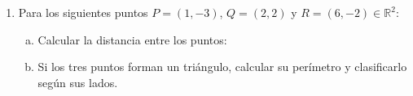 \documentclass[11pt,a4paper]{article}
\begin{document}
\begin{enumerate}[\hspace{-5mm} 1) ]
\begin{enumerate}[a)]
\begin{enumerate}[i)]
            \item Como $\vec{v}= \overrightarrow{BC}$ es igual a $(0, 2,-3)$ tenemos:
            $$\|\vec{v}\|= \|(0, 2,-3)\| = \sqrt{0^2 + 2^2+ (-3)^2}= \sqrt{ 13\,} \approx 3,605$$
            
            \item Por propiedad tenemos que $\|-v\|= \|v\|$ con lo cual:
            $$\|-\vec{v}\| = \sqrt{ 13\,} \approx 3,605 $$
            
            \item Tenemos que: 
            \begin{itemize}
                \item $\overrightarrow{m} = \overrightarrow{AC} = C-A = (1,0,-2) -(1,3,1) = (1-1,\, 0-3,\, -2-1) = (0,\, -3,\, -3)$,
            \end{itemize}
            luego tenemos:
            $$\|\sqrt{2} \cdot \overrightarrow{m}\| =   \|(0,\, -\sqrt{2}\cdot 3,\, -\sqrt{2}\cdot 3 )\| = \cdot \sqrt{0^2 +(-\sqrt{2}\cdot3)^2+(-\sqrt{2}\cdot3)^2\, } = \sqrt{ 18+18} = \sqrt{36} = 6$$  
        \end{enumerate}
\end{enumerate}


















\item  Para los siguientes puntos $P = (1, -3)$, $Q = (2, 2)$ y $R = (6, -2) \in \mathbb{R}^2$:

      
\begin{enumerate}[a)]
    \item Calcular la distancia entre los puntos:
    \begin{enumerate}[i)]
    \end{enumerate}
    
    \item Si los tres puntos forman un triángulo, calcular su perímetro y clasificarlo según sus lados.
\end{enumerate}


\end{enumerate}
\end{document}

